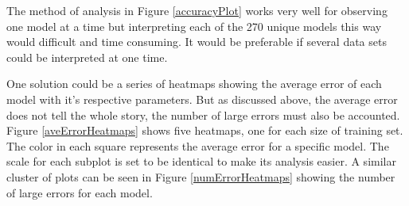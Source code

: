 \par The method of analysis in Figure \ref{accuracyPlot} works very well for observing one model at a time but interpreting each of the 270 unique models this way would difficult and time consuming. It would be preferable if several data sets could be interpreted at one time.
\par One solution could be a series of heatmaps showing the average error of each model with it's respective parameters. But as discussed above, the average error does not tell the whole story, the number of large errors must also be accounted. Figure \ref{aveErrorHeatmaps} shows five heatmaps, one for each size of training set. The color in each square represents the average error for a specific model. The scale for each subplot is set to be identical to make its analysis easier. A similar cluster of plots can be seen in Figure \ref{numErrorHeatmaps} showing the number of large errors for each model. 

